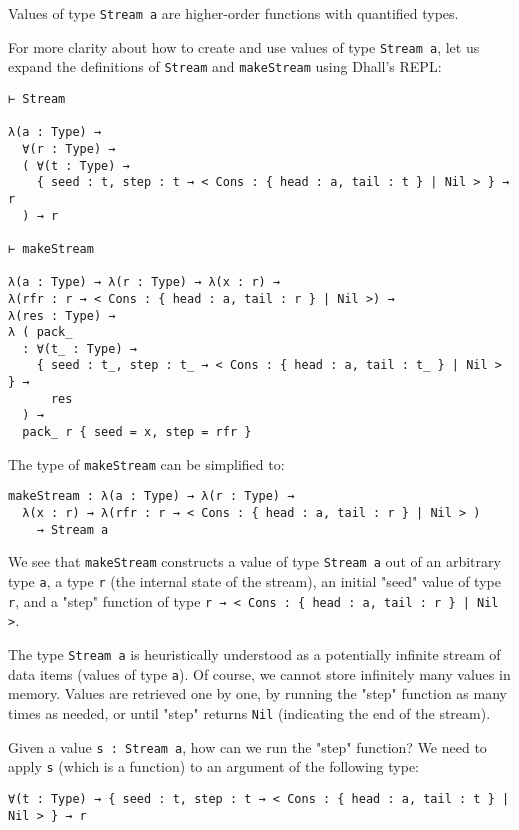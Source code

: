 Values of type \lstinline!Stream a! are higher-order functions with quantified types.


For more clarity about how to create and use values of type \lstinline!Stream a!, let us expand the definitions of \lstinline!Stream! and \lstinline!makeStream! using Dhall's REPL:


\begin{lstlisting}[language=Dhall]
⊢ Stream

λ(a : Type) →
  ∀(r : Type) →
  ( ∀(t : Type) →
    { seed : t, step : t → < Cons : { head : a, tail : t } | Nil > } → r
  ) → r

⊢ makeStream

λ(a : Type) → λ(r : Type) → λ(x : r) →
λ(rfr : r → < Cons : { head : a, tail : r } | Nil >) →
λ(res : Type) →
λ ( pack_
  : ∀(t_ : Type) →
    { seed : t_, step : t_ → < Cons : { head : a, tail : t_ } | Nil > } →
      res
  ) →
  pack_ r { seed = x, step = rfr }
\end{lstlisting}


The type of \lstinline!makeStream! can be simplified to:


\begin{lstlisting}[language=Dhall]
makeStream : λ(a : Type) → λ(r : Type) →
  λ(x : r) → λ(rfr : r → < Cons : { head : a, tail : r } | Nil > )
    → Stream a
\end{lstlisting}


We see that \lstinline!makeStream! constructs a value of type \lstinline!Stream a! out of an arbitrary type \lstinline!a!, a type \lstinline!r! (the internal state of the stream), an initial "seed" value of type \lstinline!r!, and a "step" function of type \lstinline!r → < Cons : { head : a, tail : r } | Nil >!.


The type \lstinline!Stream a! is heuristically understood as a potentially infinite stream of data items (values of type \lstinline!a!).
Of course, we cannot store infinitely many values in memory.
Values are retrieved one by one, by running the "step" function as many times as needed, or until "step" returns \lstinline!Nil! (indicating the end of the stream).


Given a value \lstinline!s : Stream a!, how can we run the "step" function?
We need to apply \lstinline!s! (which is a function) to an argument of the following type:


\begin{lstlisting}[language=Dhall]
∀(t : Type) → { seed : t, step : t → < Cons : { head : a, tail : t } | Nil > } → r
\end{lstlisting}


